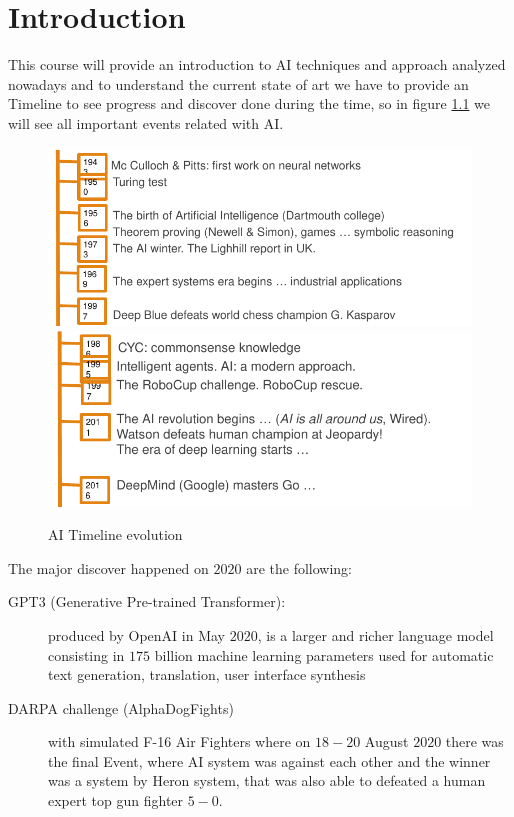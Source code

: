 \chapter{Introduction}
This course will provide an introduction to AI techniques and approach analyzed nowadays and to understand
the current state of art we have to provide an Timeline to see progress and discover done during the time,
so in figure \ref{img:timeline} we will see all important events related with AI.

\begin{figure}
    \caption{AI Timeline evolution}
    \label{img:timeline}
    \includegraphics[width=\textwidth]{Images/timeline}
    \includegraphics[width=\textwidth]{Images/timeline2}
\end{figure}
The major discover happened on $2020$ are the following:
\begin{description}
    \item [GPT3 (Generative Pre-trained Transformer): ] produced by OpenAI in May $2020$, is 
           a larger and richer language model consisting in $175$ billion machine learning parameters
           used for automatic text generation, translation, user interface synthesis
    \item [DARPA challenge (AlphaDogFights)] with simulated F-16 Air Fighters where on $18-20$ August $2020$
           there was the final Event, where AI system was against each other and the winner was a system by 
           Heron system, that was also able to defeated a human expert top gun fighter $5-0$.
\end{description}
